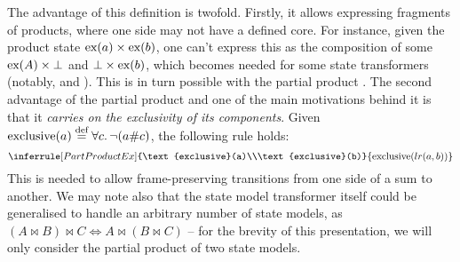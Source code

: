 The advantage of this definition is twofold. Firstly, it allows expressing fragments of products, where one side may not have a defined core. For instance, given the product state $\text{ex}(a) \times \text{ex}(b)$, one can't express this as the composition of some $\text{ex}(A) \times \bot$ and $\bot \times \text{ex}(b)$, which becomes needed for some state transformers (notably, \PMap{} and \List). This is in turn possible with the partial product . The second advantage of the partial product and one of the main motivations behind it is that it \emph{carries on the exclusivity of its components}. Given $\text{exclusive}(a) \stackrel{\textnormal{def}}= \forall c\ldotp \neg(a\# c)$, the following rule holds:
\[
\inferrule[PartProductEx]
	{\text{exclusive}(a)\\\text{exclusive}(b)}
	{\text{exclusive}(lr(a, b))}
\]
This is needed to allow frame-preserving transitions from one side of a sum to another. We may note also that the state model transformer itself could be generalised to handle an arbitrary number of state models, as $(A \bowtie B) \bowtie C \iff A \bowtie (B \bowtie C)$ -- for the brevity of this presentation, we will only consider the partial product of two state models.

